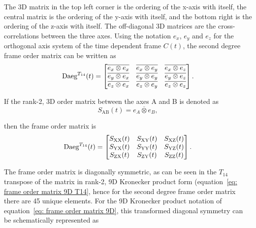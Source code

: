 The 3D matrix in the top left corner is the ordering of the x-axis with itself, the central matrix is the ordering of the y-axis with itself, and the bottom right is the ordering of the z-axis with itself.
The off-diagonal 3D matrices are the cross-correlations between the three axes.
Using the notation $e_x$, $e_y$ and $e_z$ for the orthogonal axis system of the time dependent frame $C(t)$, the second degree frame order matrix can be written as
\begin{equation}
    \textrm{Daeg}^{T_{14}}(t) =
        \begin{bmatrix}
            \overline{e_x \otimes e_x} & \overline{e_x \otimes e_y} & \overline{e_x \otimes e_z} \\
            \overline{e_y \otimes e_x} & \overline{e_y \otimes e_y} & \overline{e_y \otimes e_z} \\
            \overline{e_z \otimes e_x} & \overline{e_z \otimes e_y} & \overline{e_z \otimes e_z}
        \end{bmatrix} .
\end{equation}

If the rank-2, 3D order matrix between the axes A and B is denoted as
\begin{equation}
    S_{\textrm{AB}}(t) = \overline{e_A \otimes e_B},
\end{equation}

then the frame order matrix is
\begin{equation}
    \textrm{Daeg}^{T_{14}}(t) =
        \begin{bmatrix}
            S_{\textrm{XX}}(t) & S_{\textrm{XY}}(t) & S_{\textrm{XZ}}(t) \\
            S_{\textrm{YX}}(t) & S_{\textrm{YY}}(t) & S_{\textrm{YZ}}(t) \\
            S_{\textrm{ZX}}(t) & S_{\textrm{ZY}}(t) & S_{\textrm{ZZ}}(t)
        \end{bmatrix} .
\end{equation}


The frame order matrix is diagonally symmetric, as can be seen in the $T_{14}$ transpose of the matrix in rank-2, 9D Kronecker product form (equation~\ref{eq: frame order matrix 9D T14}, hence for the second degree frame order matrix there are 45 unique elements.
For the 9D Kronecker product notation of equation~\ref{eq: frame order matrix 9D}, this transformed diagonal symmetry can be schematically represented as

